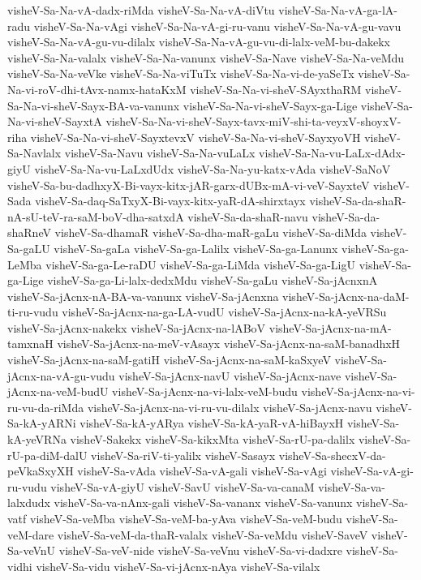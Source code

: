 {visheV-Sa-Na-vA-dadx-riMda
visheV-Sa-Na-vA-diVtu
visheV-Sa-Na-vA-ga-lA-radu
visheV-Sa-Na-vAgi
visheV-Sa-Na-vA-gi-ru-vanu
visheV-Sa-Na-vA-gu-vavu
visheV-Sa-Na-vA-gu-vu-dilalx
visheV-Sa-Na-vA-gu-vu-di-lalx-veM-bu-dakekx
visheV-Sa-Na-valalx
visheV-Sa-Na-vanunx
visheV-Sa-Nave
visheV-Sa-Na-veMdu
visheV-Sa-Na-veVke
visheV-Sa-Na-viTuTx
visheV-Sa-Na-vi-de-yaSeTx
visheV-Sa-Na-vi-roV-dhi-tAvx-namx-hataKxM
visheV-Sa-Na-vi-sheV-SAyxthaRM
visheV-Sa-Na-vi-sheV-Sayx-BA-va-vanunx
visheV-Sa-Na-vi-sheV-Sayx-ga-Lige
visheV-Sa-Na-vi-sheV-SayxtA
visheV-Sa-Na-vi-sheV-Sayx-tavx-miV-shi-ta-veyxV-shoyxV-riha
visheV-Sa-Na-vi-sheV-SayxtevxV
visheV-Sa-Na-vi-sheV-SayxyoVH
visheV-Sa-Navlalx
visheV-Sa-Navu
visheV-Sa-Na-vuLaLx
visheV-Sa-Na-vu-LaLx-dAdx-giyU
visheV-Sa-Na-vu-LaLxdUdx
visheV-Sa-Na-yu-katx-vAda
visheV-SaNoV
visheV-Sa-bu-dadhxyX-Bi-vayx-kitx-jAR-garx-dUBx-mA-vi-veV-SayxteV
visheV-Sada
visheV-Sa-daq-SaTxyX-Bi-vayx-kitx-yaR-dA-shirxtayx
visheV-Sa-da-shaR-nA-sU-teV-ra-saM-boV-dha-satxdA
visheV-Sa-da-shaR-navu
visheV-Sa-da-shaRneV
visheV-Sa-dhamaR
visheV-Sa-dha-maR-gaLu
visheV-Sa-diMda
visheV-Sa-gaLU
visheV-Sa-gaLa
visheV-Sa-ga-Lalilx
visheV-Sa-ga-Lanunx
visheV-Sa-ga-LeMba
visheV-Sa-ga-Le-raDU
visheV-Sa-ga-LiMda
visheV-Sa-ga-LigU
visheV-Sa-ga-Lige
visheV-Sa-ga-Li-lalx-dedxMdu
visheV-Sa-gaLu
visheV-Sa-jAcnxnA
visheV-Sa-jAcnx-nA-BA-va-vanunx
visheV-Sa-jAcnxna
visheV-Sa-jAcnx-na-daM-ti-ru-vudu
visheV-Sa-jAcnx-na-ga-LA-vudU
visheV-Sa-jAcnx-na-kA-yeVRSu
visheV-Sa-jAcnx-nakekx
visheV-Sa-jAcnx-na-lABoV
visheV-Sa-jAcnx-na-mA-tamxnaH
visheV-Sa-jAcnx-na-meV-vAsayx
visheV-Sa-jAcnx-na-saM-banadhxH
visheV-Sa-jAcnx-na-saM-gatiH
visheV-Sa-jAcnx-na-saM-kaSxyeV
visheV-Sa-jAcnx-na-vA-gu-vudu
visheV-Sa-jAcnx-navU
visheV-Sa-jAcnx-nave
visheV-Sa-jAcnx-na-veM-budU
visheV-Sa-jAcnx-na-vi-lalx-veM-budu
visheV-Sa-jAcnx-na-vi-ru-vu-da-riMda
visheV-Sa-jAcnx-na-vi-ru-vu-dilalx
visheV-Sa-jAcnx-navu
visheV-Sa-kA-yARNi
visheV-Sa-kA-yARya
visheV-Sa-kA-yaR-vA-hiBayxH
visheV-Sa-kA-yeVRNa
visheV-Sakekx
visheV-Sa-kikxMta
visheV-Sa-rU-pa-dalilx
visheV-Sa-rU-pa-diM-dalU
visheV-Sa-riV-ti-yalilx
visheV-Sasayx
visheV-Sa-shecxV-da-peVkaSxyXH
visheV-Sa-vAda
visheV-Sa-vA-gali
visheV-Sa-vAgi
visheV-Sa-vA-gi-ru-vudu
visheV-Sa-vA-giyU
visheV-SavU
visheV-Sa-va-canaM
visheV-Sa-va-lalxdudx
visheV-Sa-va-nAnx-gali
visheV-Sa-vananx
visheV-Sa-vanunx
visheV-Sa-vatf
visheV-Sa-veMba
visheV-Sa-veM-ba-yAva
visheV-Sa-veM-budu
visheV-Sa-veM-dare
visheV-Sa-veM-da-thaR-valalx
visheV-Sa-veMdu
visheV-SaveV
visheV-Sa-veVnU
visheV-Sa-veV-nide
visheV-Sa-veVnu
visheV-Sa-vi-dadxre
visheV-Sa-vidhi
visheV-Sa-vidu
visheV-Sa-vi-jAcnx-nAya
visheV-Sa-vilalx
}
